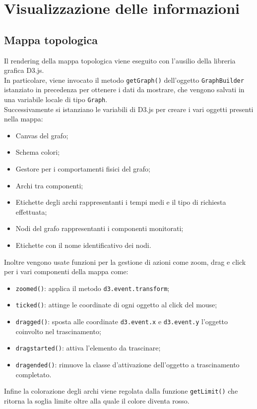 \section{Visualizzazione delle informazioni}

\subsection{Mappa topologica}
Il rendering della mappa topologica viene eseguito con l'ausilio della libreria grafica D3.js. \\
In particolare, viene invocato il metodo \texttt{getGraph()} dell'oggetto \texttt{GraphBuilder} istanziato in precedenza per ottenere i dati da mostrare, che vengono salvati in una variabile locale di tipo \texttt{Graph}. \\
Successivamente si istanziano le variabili di D3.js per creare i vari oggetti presenti nella mappa:
\begin{itemize}
	\item Canvas del grafo;
	\item Schema colori;
	\item Gestore per i comportamenti fisici del grafo;
	\item Archi tra componenti;
	\item Etichette degli archi rappresentanti i tempi medi e il tipo di richiesta effettuata;
	\item Nodi del grafo rappresentanti i componenti monitorati;
	\item Etichette con il nome identificativo dei nodi.
\end{itemize}
Inoltre vengono usate funzioni per la gestione di azioni come zoom, drag e click per i vari componenti della mappa come:
\begin{itemize}
	\item \texttt{zoomed()}: applica il metodo \texttt{d3.event.transform};
	\item \texttt{ticked()}: attinge le coordinate di ogni oggetto al click del mouse;
	\item \texttt{dragged()}: sposta alle coordinate \texttt{d3.event.x} e \texttt{d3.event.y} l'oggetto coinvolto nel trascinamento;
	\item \texttt{dragstarted()}: attiva l'elemento da trascinare;
	\item \texttt{dragended()}: rimuove la classe d'attivazione dell'oggetto a trascinamento completato.
\end{itemize}

Infine la colorazione degli archi viene regolata dalla funzione \texttt{getLimit()} che ritorna la soglia limite oltre alla quale il colore diventa rosso. 



